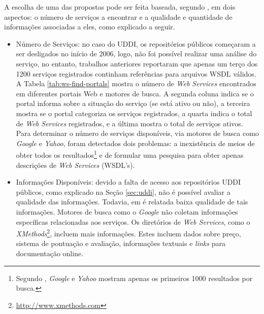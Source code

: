 A escolha de uma das propostas pode ser feita baseada, segundo \cite{lausen2007finding}, em dois aspectos: o número de serviços a encontrar e a qualidade e quantidade de informações associadas a eles, como explicado a seguir.

\begin{itemize}
	\item Número de Serviços: no caso do UDDI, os repositórios públicos começaram a ser desligados no início de 2006, logo, não foi possível realizar uma análise do serviço, no entanto, trabalhos anteriores reportaram que apenas um terço dos 1200 serviços registrados continham referências para arquivos WSDL válidos. 
A Tabela \ref{tab:ws-find-portals} mostra o número de \textit{Web Services} encontrados em diferentes portais Web e motores de busca. A segunda coluna
indica se o portal informa sobre a situação do serviço (se está ativo ou não),
a terceira mostra se o portal categoriza os serviços registrados,
a quarta indica o total de \textit{Web Services} registrados, e a última mostra o total de serviços ativos.
Para determinar o número de serviços disponíveis, via motores de busca como \textit{Google} e \textit{Yahoo}, foram detectados dois problemas: a inexistência de meios de obter todos os resultados\footnote{Segundo \cite{lausen2007finding}, \textit{Google} e \textit{Yahoo} mostram apenas os primeiros 1000 resultados por busca.} e de formular uma pesquisa para obter apenas descrições de \textit{Web Services} (WSDL's).
 \item Informações Disponíveis: devido a falta de acesso aos repositórios UDDI públicos, como explicado na Seção \ref{sec:uddi}, não é possível avaliar a qualidade das informações. Todavia, em \cite{kim2004survey} é relatada baixa qualidade de tais informações. Motores de busca como o \textit{Google} não coletam informações específicas relacionadas aos serviços. Os diretórios de \textit{Web Services}, como o \textit{XMethods}\footnote{\url{http://www.xmethods.com}}, incluem mais informações. Estes incluem dados sobre preço, sistema de pontuação e avaliação, informações textuais e \textit{links} para documentação online.
\end{itemize}

